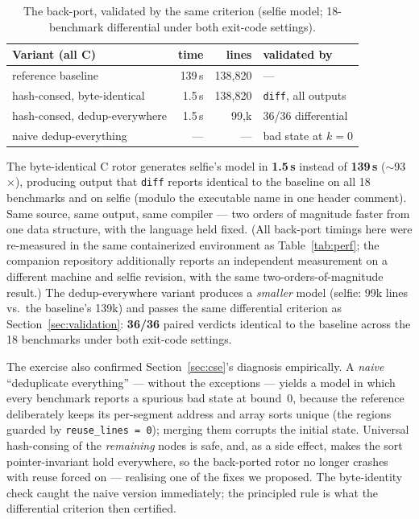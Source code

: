 \documentclass[sigplan,screen,nonacm]{acmart}
\begin{document}
\begin{table}[t]
\caption{The back-port, validated by the same criterion (selfie model;
18-benchmark differential under both exit-code settings).}
\label{tab:backport}
\centering
\footnotesize
\setlength{\tabcolsep}{3pt}%
\begin{tabular}{lrrl}
\toprule
Variant (all C) & time & lines & validated by \\
\midrule
reference baseline & 139\,s & 138{,}820 & --- \\
hash-consed, byte-identical & 1.5\,s & 138{,}820 & \texttt{diff}, all outputs \\
hash-consed, dedup-everywhere & 1.5\,s & 99{,}k & 36/36 differential \\
naive dedup-everything & --- & --- & bad state at $k{=}0$ \\
\bottomrule
\end{tabular}
\end{table}

The byte-identical C rotor generates selfie's model in \textbf{1.5\,s}
instead of \textbf{139\,s} ($\sim$93$\times$), producing output that
\texttt{diff} reports identical to the baseline on all 18 benchmarks and on
selfie (modulo the executable name in one header comment). Same source, same
output, same compiler --- two orders of magnitude faster from one data
structure, with the language held fixed. (All back-port timings here
were re-measured in the same containerized environment as
Table~\ref{tab:perf}; the companion repository additionally reports an
independent measurement on a different machine and selfie revision,
with the same two-orders-of-magnitude result.) The dedup-everywhere
variant
produces a \emph{smaller} model (selfie: 99k lines vs.\ the baseline's 139k)
and passes the same differential criterion as Section~\ref{sec:validation}:
\textbf{36/36} paired verdicts identical to the baseline across the 18
benchmarks under both exit-code settings.

The exercise also confirmed Section~\ref{sec:cse}'s diagnosis empirically. A
\emph{naive} ``deduplicate everything'' --- without the exceptions --- yields
a model in which every benchmark reports a spurious bad state at bound~0,
because the reference deliberately keeps its per-segment address and array
sorts unique (the regions guarded by \texttt{reuse\_lines = 0}); merging them
corrupts the initial state. Universal hash-consing of the \emph{remaining}
nodes is safe, and, as a side effect, makes the sort pointer-invariant hold
everywhere, so the back-ported rotor no longer crashes with reuse forced on
--- realising one of the fixes we proposed. The byte-identity check caught
the naive version immediately; the principled rule is what the differential
criterion then certified.
\end{document}
